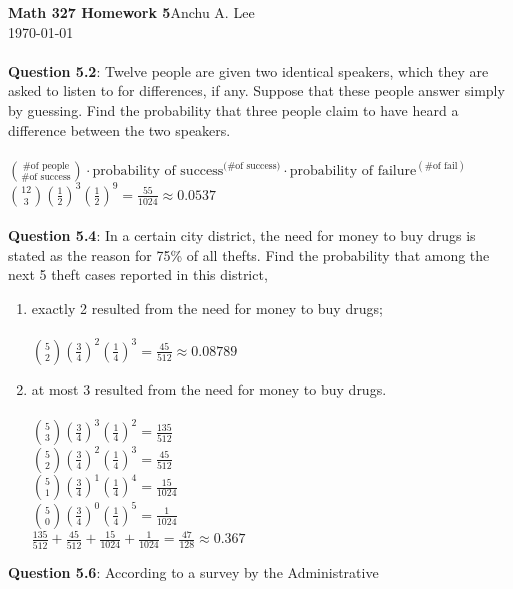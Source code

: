 \documentclass{article}
\begin{document}
    \noindent\textbf{Math 327 Homework 5}\hfill Anchu A. Lee\\
    \noindent\today\\\\
    \textbf{Question 5.2}: Twelve people are given two identical speakers, which they are asked to listen to for differences, if any. 
    Suppose that these people answer simply by guessing. Find the probability that three people claim to have heard a difference between the two speakers.\\\\
        \indent $\binom{\text{\# of people}}{\text{\# of success}} \cdot \text{probability of success}^{\text{(\# of success})} \cdot \text{probability of failure}^{(\text{\# of fail})}$ \\
        \indent $\binom{12}{3}(\frac{1}{2})^{3}(\frac{1}{2})^{9} = \frac{55}{1024} \approx 0.0537$
        \\\\
    \textbf{Question 5.4}: In a certain city district, the need for money to buy drugs is stated as the reason for 75\% of all thefts. 
    Find the probability that among the next 5 theft cases reported in this district,
        \begin{enumerate}[label = (\alph*) ]
            \item  exactly 2 resulted from the need for money to buy drugs; \\\\
                \indent $\binom{5}{2}(\frac{3}{4})^{2}(\frac{1}{4})^{3} = \frac{45}{512} \approx 0.08789$
            \item  at most 3 resulted from the need for money to buy drugs. \\\\
                \indent $\binom{5}{3}(\frac{3}{4})^{3}(\frac{1}{4})^{2} = \frac{135}{512}$\\
                \indent $\binom{5}{2}(\frac{3}{4})^{2}(\frac{1}{4})^{3} = \frac{45}{512}$\\
                \indent $\binom{5}{1}(\frac{3}{4})^{1}(\frac{1}{4})^{4} = \frac{15}{1024}$\\
                \indent $\binom{5}{0}(\frac{3}{4})^{0}(\frac{1}{4})^{5} = \frac{1}{1024}$\\
                \indent $\frac{135}{512} + \frac{45}{512} + \frac{15}{1024} + \frac{1}{1024} = \frac{47}{128} \approx 0.367$
        \end{enumerate}
    \textbf{Question 5.6}: According to a survey by the Administrative
\end{document}
